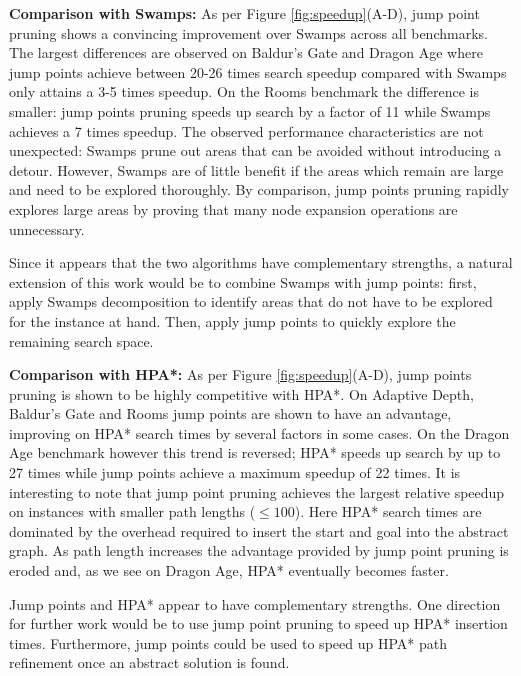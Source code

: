 \textbf{Comparison with Swamps: }
As per Figure \ref{fig:speedup}(A-D), jump point pruning shows a convincing
improvement over Swamps across all benchmarks. 
The largest differences are observed on Baldur's Gate and Dragon Age where jump 
points achieve between 20-26 times search speedup compared with Swamps
only attains a 3-5 times speedup.
On the Rooms benchmark the difference is smaller: jump points pruning
speeds up search by a factor of 11 while Swamps achieves a 7 times
speedup.
The observed performance characteristics are not unexpected: Swamps prune out
areas that can be avoided without introducing a detour. However, Swamps are of
little benefit if the areas which remain are large and need to be explored 
thoroughly.
By comparison, jump points pruning rapidly explores large areas by proving
that many node expansion operations are unnecessary.
\par
Since it appears that the two algorithms have complementary strengths, a natural
extension of this work would be to combine Swamps with jump points:
first, apply Swamps decomposition to identify areas that do not have to be
explored for the instance at hand. Then, apply jump points to quickly explore the
remaining search space.
\par
\textbf{Comparison with HPA*: }
As per Figure \ref{fig:speedup}(A-D), jump points pruning is shown to be 
highly competitive with HPA*.
On Adaptive Depth, Baldur's Gate and Rooms jump points are shown to have an 
advantage, improving on HPA* search times by several factors in some cases.
On the Dragon Age benchmark however this trend is reversed; HPA* speeds up
search by up to 27 times while jump points achieve a maximum speedup of 22
times.
It is interesting to note that jump point pruning achieves the largest relative
speedup on instances with smaller path lengths
($\leq 100$). Here HPA* search times are dominated by the overhead required to
insert the start and goal into the abstract graph.
As path length increases the advantage provided by jump point pruning is eroded
and, as we see on Dragon Age, HPA* eventually becomes faster.
\par
Jump points and HPA* appear to have complementary strengths.
One direction for further work would be to use jump point pruning to speed up
HPA* insertion times. Furthermore,  jump points could be used to speed up 
HPA* path refinement once an abstract solution is found.
